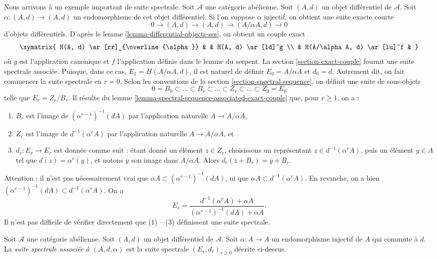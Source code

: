 \noindent
Nous arrivons à un exemple important de suite spectrale.
Soit $\mathcal{A}$ une catégorie abélienne.
Soit $(A, d)$ un objet différentiel de $\mathcal{A}$.
Soit $\alpha : (A, d) \to (A, d)$ un endomorphisme de cet objet
différentiel. Si l'on suppose $\alpha$ injectif, on obtient une suite exacte courte
$$
0 \to (A, d) \to (A, d) \to (A/\alpha A, d) \to 0
$$
d'objets différentiels. D'après le
lemme \ref{lemma-differential-objects-ses}, on obtient un couple exact
$$
\xymatrix{
H(A, d) \ar[rr]_{\overline{\alpha}} & & H(A, d) \ar[ld]^g \\
& H(A/\alpha A, d) \ar[lu]^f &
}
$$
où $g$ est l'application canonique et $f$ l'application définie dans le lemme du serpent.
La section \ref{section-exact-couple} fournit une suite spectrale associée.
Puisque, dans ce cas, $E_1 = H(A/\alpha A, d)$,
il est naturel de définir $E_0 = A/\alpha A$ et $d_0 = d$.
Autrement dit, on fait commencer la suite spectrale
en $r = 0$. Selon les conventions de la
section \ref{section-spectral-sequence}, on définit une suite de sous-objets
$$
0 = B_0 \subset \ldots \subset B_r \subset \ldots
\subset Z_r \subset \ldots \subset Z_0 = E_0
$$
telle que $E_r = Z_r/B_r$. Il résulte du
lemme \ref{lemma-spectral-sequence-associated-exact-couple}
que, pour $r \geq 1$, on a :
\begin{enumerate}
\item $B_r$ est l'image de $(\alpha^{r - 1})^{-1}(d A)$
par l'application naturelle $A \to A/\alpha A$,
\item $Z_r$ est l'image de $d^{-1}(\alpha^r A)$
par l'application naturelle $A \to A/\alpha A$, et
\item $d_r : E_r \to E_r$ est donnée comme suit : étant donné un élément
$\overline{z} \in Z_r$, choisissons un représentant
$z \in d^{-1}(\alpha^r A)$, puis un élément $y \in A$ tel que
$d(z) = \alpha^r(y)$, et notons $\overline{y}$ son image dans
$A/\alpha A$. Alors
$d_r(\overline{z} + B_r) = \overline{y} + B_r$.
\end{enumerate}
Attention : il n'est pas nécessairement vrai que
$\alpha A \subset (\alpha^{r - 1})^{-1}(dA)$, ni que
$\alpha A \subset d^{-1}(\alpha^r A)$. En revanche, on a bien
$(\alpha^{r - 1})^{-1}(dA) \subset d^{-1}(\alpha^r A)$.
On a
$$
E_r
=
\frac{d^{-1}(\alpha^r A) + \alpha A}{(\alpha^{r - 1})^{-1}(dA) + \alpha A}.
$$
Il n'est pas difficile de vérifier directement que (1) -- (3) définissent une suite spectrale.

\begin{definition}
\label{definition-differential-object-selfmap}
Soit $\mathcal{A}$ une catégorie abélienne.
Soit $(A, d)$ un objet différentiel de $\mathcal{A}$.
Soit $\alpha : A \to A$ un endomorphisme injectif de $A$ qui
commute à $d$. La {\it suite spectrale associée à
$(A, d, \alpha)$} est la suite spectrale
$(E_r, d_r)_{r \geq 0}$ décrite ci-dessus.
\end{definition}


